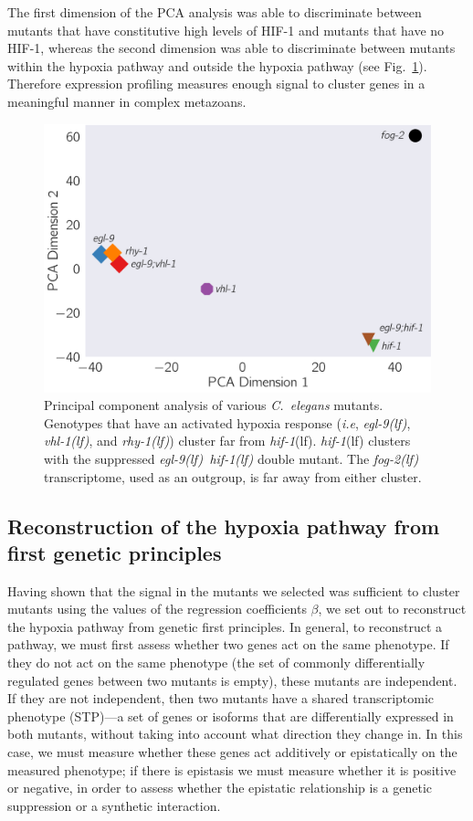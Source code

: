 \documentclass[10pt, onecolumn]{article}
\newcommand{\cel}{\emph{C.~elegans}}
\newcommand{\fog}{\emph{\mbox{fog-2(lf)}}}
\newcommand{\egl}{\emph{\mbox{egl-9}(lf)}}
\newcommand{\rhy}{\emph{\mbox{rhy-1}(lf)}}
\newcommand{\vhl}{\emph{\mbox{vhl-1}(lf)}}
\newcommand{\eglhif}{\emph{\mbox{egl-9(lf)}~\mbox{hif-1(lf)}}}
\newcommand{\hif}{\emph{\mbox{hif-1}}(lf)}
\newcommand{\hifp}{HIF-1}
\begin{document}
The first dimension of the PCA analysis was able to discriminate between mutants
that have constitutive high levels of \hifp{} and mutants that have no \hifp{},
whereas the second dimension was able to discriminate between mutants within the
hypoxia pathway and outside the hypoxia pathway (see Fig.~\ref{fig:pca}).
Therefore expression profiling measures enough signal to cluster genes in a
meaningful manner in complex metazoans.

\begin{figure}[tbhp]
\centering
\includegraphics[width=0.5\linewidth]{../figs/pca.pdf}
\caption{
Principal component analysis of various \cel{} mutants. Genotypes that have an
activated hypoxia response (\emph{i.e}, \egl{}, \vhl{}, and \rhy{}) cluster far
from \hif{}. \hif{} clusters with the suppressed \eglhif{} double mutant.
The \fog{} transcriptome, used as an outgroup, is far away from either cluster.
}
\label{fig:pca}
\end{figure}

\subsection*{Reconstruction of the hypoxia pathway from first genetic principles}
\label{sec:reconstruct}
Having shown that the signal in the mutants we selected was sufficient to
cluster mutants using the values of the regression coefficients $\beta$, we set
out to reconstruct the hypoxia pathway from genetic first principles. In general,
to reconstruct a pathway, we must first assess whether two genes act on the same
phenotype. If they do not act on the same phenotype (the set of commonly differentially
regulated genes between two mutants is empty), these mutants are independent.
If they are not independent, then two mutants have a shared transcriptomic
phenotype (STP)---a set of genes or isoforms that are differentially expressed in
both mutants, without taking into account what direction they change in. In this
case, we must measure whether these genes act additively or epistatically on the
measured phenotype; if there is epistasis we must measure whether it is
positive or negative, in order to assess whether the epistatic relationship is a
genetic suppression or a synthetic interaction.
\end{document}
